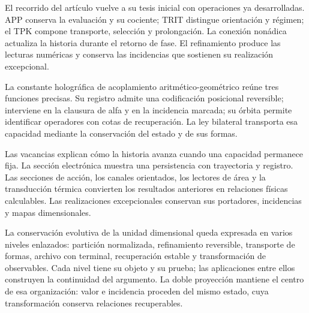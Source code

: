 
El recorrido del artículo vuelve a su tesis inicial con operaciones
ya desarrolladas. APP conserva la evaluación y su cociente;
TRIT distingue orientación y régimen; el TPK compone transporte,
selección y prolongación. La conexión nonádica actualiza la
historia durante el retorno de fase. El refinamiento produce
las lecturas numéricas y conserva las incidencias que sostienen
su realización excepcional.

La constante holográfica de acoplamiento aritmético-geométrico
reúne tres funciones precisas. Su registro admite una codificación
posicional reversible; interviene en la clausura de alfa y en
la incidencia marcada; su órbita permite identificar operadores
con cotas de recuperación. La ley bilateral transporta esa
capacidad mediante la conservación del estado y de sus formas.

Las vacancias explican cómo la historia avanza cuando una
capacidad permanece fija. La sección electrónica muestra una
persistencia con trayectoria y registro. Las secciones de acción,
los canales orientados, los lectores de área y la transducción
térmica convierten los resultados anteriores en relaciones
físicas calculables. Las realizaciones excepcionales conservan
sus portadores, incidencias y mapas dimensionales.

La conservación evolutiva de la unidad dimensional queda
expresada en varios niveles enlazados: partición normalizada,
refinamiento reversible, transporte de formas, archivo con
terminal, recuperación estable y transformación de observables.
Cada nivel tiene su objeto y su prueba; las aplicaciones entre
ellos construyen la continuidad del argumento. La doble
proyección mantiene el centro de esa organización: valor e
incidencia proceden del mismo estado, cuya transformación
conserva relaciones recuperables.

